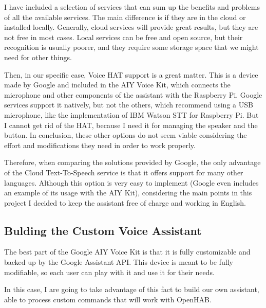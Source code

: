 \addtocounter{footnote}{-2}

I have included a selection of services that can sum up the benefits and problems of all the available services. The main difference 
is if they are in the cloud or installed locally. Generally, cloud services will provide great results, but they are not free in 
most cases. Local services can be free and open source, but their recognition is usually poorer, and they require some storage 
space that we might need for other things.

Then, in our specific case, Voice HAT support is a great matter. This is a device made by Google and included in the AIY Voice Kit, 
which connects the microphone and other components of the assistant with the Raspberry Pi. Google services support it natively, 
but not the others, which recommend using a USB microphone, like the implementation of IBM Watson STT for Raspberry Pi. But I 
cannot get rid of the HAT, because I need it for managing the speaker and the button. In conclusion, these other options do not 
seem viable considering the effort and modifications they need in order to work properly.

Therefore, when comparing the solutions provided by Google, the only advantage of the Cloud Text-To-Speech service is that it offers 
support for many other languages. Although this option is very easy to implement (Google even includes an example of its usage with 
the AIY Kit), considering the main points in this project I decided to keep the assistant free of charge and working in English.

\subsection{Bulding the Custom Voice Assistant}
The best part of the Google AIY Voice Kit is that it is fully customizable and backed up by the Google Assistant API. This device 
is meant to be fully modifiable, so each user can play with it and use it for their needs.

In this case, I are going to take advantage of this fact to build our own assistant, able to process custom commands that will 
work with OpenHAB. 

